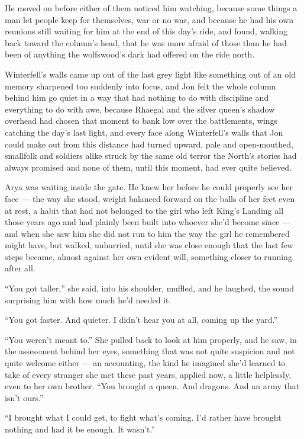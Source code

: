 He moved on before either of them noticed him watching, because some things a man let people keep for themselves, war or no war, and because he had his own reunions still waiting for him at the end of this day’s ride, and found, walking back toward the column’s head, that he was more afraid of those than he had been of anything the wolfswood’s dark had offered on the ride north.

\sceneBreak

Winterfell’s walls came up out of the last grey light like something out of an old memory sharpened too suddenly into focus, and Jon felt the whole column behind him go quiet in a way that had nothing to do with discipline and everything to do with awe, because Rhaegal and the silver queen’s shadow overhead had chosen that moment to bank low over the battlements, wings catching the day’s last light, and every face along Winterfell’s walls that Jon could make out from this distance had turned upward, pale and open-mouthed, smallfolk and soldiers alike struck by the same old terror the North’s stories had always promised and none of them, until this moment, had ever quite believed.

Arya was waiting inside the gate. He knew her before he could properly see her face — the way she stood, weight balanced forward on the balls of her feet even at rest, a habit that had not belonged to the girl who left King’s Landing all those years ago and had plainly been built into whoever she’d become since — and when she saw him she did not run to him the way the girl he remembered might have, but walked, unhurried, until she was close enough that the last few steps became, almost against her own evident will, something closer to running after all.

“You got taller,” she said, into his shoulder, muffled, and he laughed, the sound surprising him with how much he’d needed it.

“You got faster. And quieter. I didn’t hear you at all, coming up the yard.”

“You weren’t meant to.” She pulled back to look at him properly, and he saw, in the assessment behind her eyes, something that was not quite suspicion and not quite welcome either — an accounting, the kind he imagined she’d learned to take of every stranger she met these past years, applied now, a little helplessly, even to her own brother. “You brought a queen. And dragons. And an army that isn’t ours.”

“I brought what I could get, to fight what’s coming. I’d rather have brought nothing and had it be enough. It wasn’t.”


